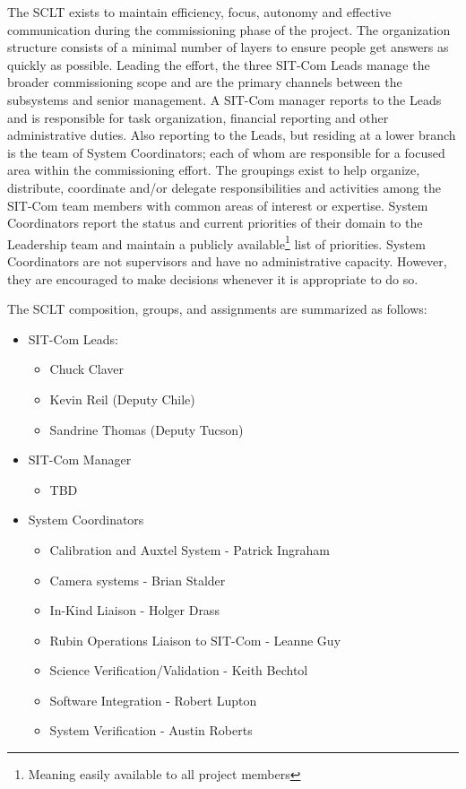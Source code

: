 \documentclass[SE,lsstdraft,authoryear,toc]{lsstdoc, lsstdraft}
\begin{document}
The SCLT exists to maintain efficiency, focus, autonomy and effective communication during the commissioning phase of the project.
The organization structure consists of a minimal number of layers to ensure people get answers as quickly as possible.
Leading the effort, the three SIT-Com Leads manage the broader commissioning scope and are the primary channels between the subsystems and senior management.
A SIT-Com manager reports to the Leads and is responsible for task organization, financial reporting and other administrative duties.
Also reporting to the Leads, but residing at a lower branch is the team of System Coordinators; each of whom are responsible for a focused area within the commissioning effort.
The groupings exist to help organize, distribute, coordinate and/or delegate responsibilities and activities among the SIT-Com team members with common areas of interest or expertise.
System Coordinators report the status and current priorities of their domain to the Leadership team and maintain a publicly available\footnote{Meaning easily available to all project members} list of priorities.
System Coordinators are not supervisors and have no administrative capacity.
However, they are encouraged to make decisions whenever it is appropriate to do so.

The SCLT composition, groups, and assignments are summarized as follows:
\begin{itemize}
    \item SIT-Com Leads:
    \begin{itemize}
        \item Chuck Claver
        \item Kevin Reil (Deputy Chile)
        \item Sandrine Thomas (Deputy Tucson)
    \end{itemize}
    \item SIT-Com Manager
    \begin{itemize}
        \item TBD
    \end{itemize}
    \item System Coordinators
    \begin{itemize}
        \item Calibration and Auxtel System - Patrick Ingraham
        \item Camera systems - Brian Stalder
        \item In-Kind Liaison - Holger Drass
        \item Rubin Operations Liaison to SIT-Com - Leanne Guy
        \item Science Verification/Validation - Keith Bechtol
        \item Software Integration - Robert Lupton
        \item System Verification - Austin Roberts
    \end{itemize}
\end{itemize}
\end{document}
